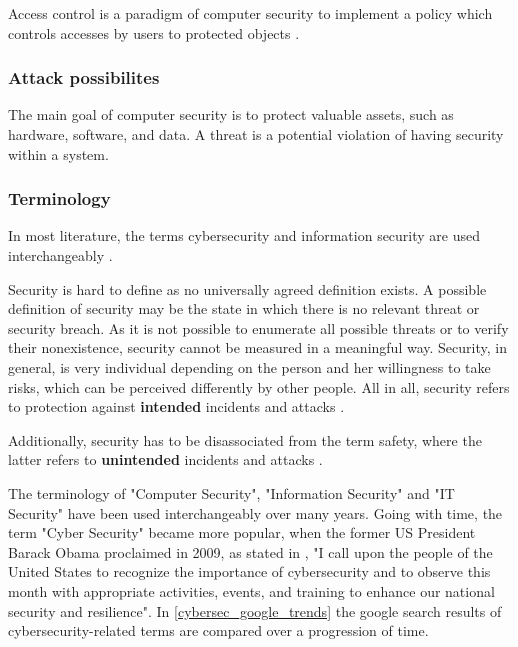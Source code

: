 Access control is a paradigm of computer security to implement a policy which controls accesses by users to protected objects \cite{Pfleeger2014}.


\subsubsection{Attack possibilites}
The main goal of computer security is to protect valuable assets, such as hardware, software, and data. A threat is a potential violation of having security within a system.


\subsubsection{Terminology}
In most literature, the terms cybersecurity and information security are used interchangeably \cite{VonSolms2013}.

Security is hard to define as no universally agreed definition exists. A possible definition of security may be the state in which there is no relevant threat or security breach. As it is not possible to enumerate all possible threats or to verify their nonexistence, security cannot be measured in a meaningful way. Security, in general, is very individual depending on the person and her willingness to take risks, which can be perceived differently by other people. All in all, security refers to protection against \textbf{intended} incidents and attacks \cite{Bishop2004, Pfleeger2014}.

Additionally, security has to be disassociated from the term safety, where the latter refers to \textbf{unintended} incidents and attacks \cite{Bishop2004}.

The terminology of "Computer Security", "Information Security" and "IT Security" have been used interchangeably over many years. Going with time, the term "Cyber Security" became more popular, when the former US President Barack Obama proclaimed in 2009, as stated in \cite{TheWhiteHouse2009}, "I call upon the people of the United States to recognize the importance of cybersecurity and to observe this month with appropriate activities, events, and training to enhance our national security and resilience". In \ref{cybersec_google_trends} the google search results of cybersecurity-related terms are compared over a progression of time.

